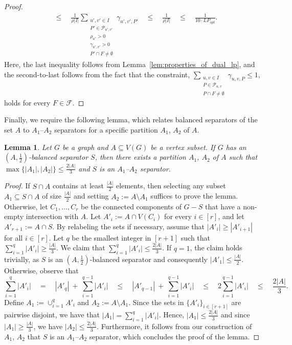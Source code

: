\documentclass[11pt]{amsart}
\newtheorem{lemma}[theorem]{Lemma}
\newcommand{\lpopt}{LP_{opt}}
\begin{document}
\begin{proof}
\begin{align*}
        &\leq \quad \frac{1}{\rho |I|}\sum_{\substack{u',v'\in I\\ P' \in \mathcal{P}_{u',v'} \\\rho_{u'} > 0\\ \gamma_{u',v'} > 0 \\ P' \cap F \neq \emptyset}} \gamma_{u',v',P'} \quad 
        \leq \quad \frac{1}{\rho |I|} \quad
        \leq \quad \frac{1}{10 \cdot \lpopt}.
    \end{align*}
    Here, the last inequality follows from Lemma~\ref{lem:properties_of_dual_lp}, and the second-to-last follows from the fact that 
    the constraint, $\sum_{\substack{u,v \in I\\ P\in \mathcal{P}_{u,v}\\ P\cap F\neq \emptyset}} \gamma_{u,v,P} \leq 1$, holds for every $F \in \mathcal{F}$.
\end{proof}

Finally, we require the following lemma, which relates balanced separators of the set $A$ to $A_1$--$A_2$ separators for a specific partition $A_1$, $A_2$ of $A$.

\begin{lemma}\label{lem:separation_vs_separators}
    Let $G$ be a graph and $A\subseteq V(G)$ be a vertex subset. If $G$ has an $(A,\frac{1}{2})$-balanced separator $S$, then there exists a partition $A_1$, $A_2$ of $A$ such that $\max\{|A_1|, |A_2|\} \leq \frac{2|A|}{3}$ and $S$ is an $A_1$--$A_2$ separator.
\end{lemma}
\begin{proof}
    If $S\cap A$ contains at least $\frac{|A|}{2}$ elements, then selecting any subset $A_1 \subseteq S\cap A$ of size $\frac{|A|}{2}$ and setting $A_2 := A \setminus A_1$ suffices to prove the lemma. Otherwise, let $C_1, \dots, C_r$ be the connected components of $G-S$ that have a non-empty intersection with $A$. Let $A'_i := A \cap V(C_i)$ for every $i \in [r]$, and let $A'_{r+1} := A \cap S$. By relabeling the sets if necessary, assume that $|A'_i| \geq |A'_{i+1}|$ for all $i \in [r]$. Let $q$ be the smallest integer in $[r+1]$ such that $\sum_{i=1}^{q}|A'_i| \geq \frac{|A|}{3}$. We claim that $\sum_{i=1}^{q}|A'_i| \leq \frac{2|A|}{3}$. If $q = 1$, the claim holds trivially, as $S$ is an $(A,\frac{1}{2})$-balanced separator and consequently $|A'_1|\leq \frac{|A|}{2}$. Otherwise, observe that
    $$
    \sum_{i=1}^{q}|A'_i| \quad
    = \quad |A'_{q}|\ +\ \sum_{i=1}^{q-1}|A'_i| \quad
    \leq \quad |A'_{q-1}|\ +\ \sum_{i=1}^{q-1}|A'_i| \quad
    \leq \quad 2\sum_{i=1}^{q-1}|A'_i| \quad
    \leq \quad \frac{2|A|}{3}.
    $$
    Define $A_1 := \cup_{i=1}^{q} A'_i$ and $A_2 := A\setminus A_1$. Since the sets in $\{A'_i\}_{i\in [r+1]}$ are pairwise disjoint, we have that $|A_1| = \sum_{i=1}^{q}|A'_i|$. Hence, $|A_1| \leq \frac{2|A|}{3}$ and since $|A_1| \geq \frac{|A|}{3}$, we have $|A_2| \leq \frac{2|A|}{3}$. Furthermore, it follows from our construction of $A_1$, $A_2$ that $S$ is an $A_1$--$A_2$ separator, which concludes the proof of the lemma.
\end{proof}
\end{document}
